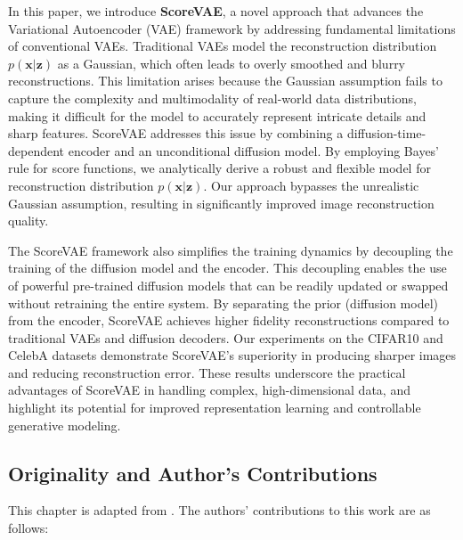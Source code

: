 In this paper, we introduce \textbf{ScoreVAE}, a novel approach that advances the Variational Autoencoder (VAE) framework by addressing fundamental limitations of conventional VAEs. Traditional VAEs model the reconstruction distribution $p(\mathbf{x}|\mathbf{z})$ as a Gaussian, which often leads to overly smoothed and blurry reconstructions. This limitation arises because the Gaussian assumption fails to capture the complexity and multimodality of real-world data distributions, making it difficult for the model to accurately represent intricate details and sharp features. ScoreVAE addresses this issue by combining a diffusion-time-dependent encoder and an unconditional diffusion model. By employing Bayes' rule for score functions, we analytically derive a robust and flexible model for reconstruction distribution $p(\mathbf{x}|\mathbf{z})$. Our approach bypasses the unrealistic Gaussian assumption, resulting in significantly improved image reconstruction quality.

The ScoreVAE framework also simplifies the training dynamics by decoupling the training of the diffusion model and the encoder. This decoupling enables the use of powerful pre-trained diffusion models that can be readily updated or swapped without retraining the entire system. By separating the prior (diffusion model) from the encoder, ScoreVAE achieves higher fidelity reconstructions compared to traditional VAEs and diffusion decoders. Our experiments on the CIFAR10 and CelebA datasets demonstrate ScoreVAE’s superiority in producing sharper images and reducing reconstruction error. These results underscore the practical advantages of ScoreVAE in handling complex, high-dimensional data, and highlight its potential for improved representation learning and controllable generative modeling.

\subsection*{Originality and Author’s Contributions}

This chapter is adapted from \cite{batzolis2023variational}. The authors' contributions to this work are as follows:

